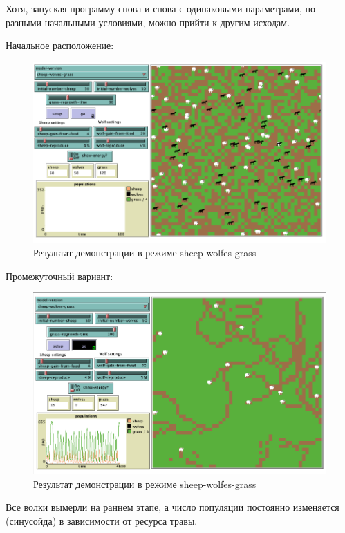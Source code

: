 \documentclass[14pt,a4paper,report]{report}
\begin{document}
Хотя, запуская программу снова и снова с одинаковыми параметрами, но разными начальными условиями, можно прийти к другим исходам.

Начальное расположение:

\begin{figure}[h!]
	\centering
	\includegraphics[scale = 0.63]{images/7_1.png}
	\caption{Результат демонстрации в режиме sheep-wolfes-grass}
\end{figure}
\clearpage
Промежуточный вариант:
\begin{figure}[h!]
	\centering
	\includegraphics[scale = 0.63]{images/7_2.png}
	\caption{Результат демонстрации в режиме sheep-wolfes-grass}
\end{figure}
\clearpage
Все волки вымерли на раннем этапе, а число популяции постоянно изменяется (синусойда) в зависимости от ресурса травы.
\end{document}
